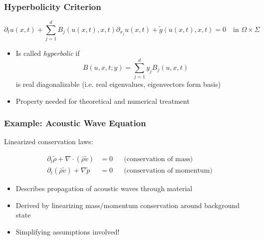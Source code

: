 \documentclass[aspectratio=169,11pt]{beamer}
\theoremstyle{definition}
\begin{document}
\begin{frame}
\frametitle{Hyperbolicity Criterion}

\begin{equation*}
\partial_t u(x,t) + \sum_{j=1}^{d} B_j(u(x,t),x,t) \partial_{x_j} u(x,t) + \tilde{g}(u(x,t),x,t) = 0
\quad\text{in $\Omega\times\Sigma$}
\end{equation*}

\begin{itemize}
  \item Is called \textit{hyperbolic} if
        \begin{equation*}\label{eq:BMatrix}
          B(u,x,t; y) = \sum_{j=1}^{d} y_j B_j(u,x,t)
        \end{equation*}
        is real diagonalizable (i.e. real eigenvalues, eigenvectors form basis)
  \item Property needed for theoretical and numerical treatment
\end{itemize}
\end{frame}


\begin{frame}
\frametitle{Example: Acoustic Wave Equation}

Linearized conservation laws:

\begin{align*}
  \partial_t \tilde{\rho} +  \nabla\cdot(\bar{\rho} \tilde{v}) &= 0 &&\text{(conservation of mass)}\\
  \partial_t (\bar\rho \tilde{v}) + \nabla \tilde{p} &= 0 &&\text{(conservation of momentum)}
\end{align*}

\begin{itemize}
  \item Describes propagation of acoustic waves through material
  \item Derived by linearizing mass/momentum conservation around background state
  \item Simplifying assumptions involved!
\end{itemize}
\end{frame}
\end{document}
